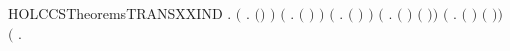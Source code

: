 \begin{SaveVerbatim}{HOLCCSTheoremsTRANSXXIND}
\HOLTokenTurnstile{} \HOLSymConst{\HOLTokenForall{}}.
       \ensuremath{(}\HOLSymConst{\HOLTokenForall{}} .  \ensuremath{(}\HOLSymConst{\ensuremath{\ldotp}}\ensuremath{)}  \ensuremath{)} \HOLSymConst{\HOLTokenConj{}}
       \ensuremath{(}\HOLSymConst{\HOLTokenForall{}}   .     \HOLSymConst{\HOLTokenImp{}}  \ensuremath{(} \HOLSymConst{\ensuremath{+}} \ensuremath{)}  \ensuremath{)} \HOLSymConst{\HOLTokenConj{}}
       \ensuremath{(}\HOLSymConst{\HOLTokenForall{}}   .     \HOLSymConst{\HOLTokenImp{}}  \ensuremath{(} \HOLSymConst{\ensuremath{+}} \ensuremath{)}  \ensuremath{)} \HOLSymConst{\HOLTokenConj{}}
       \ensuremath{(}\HOLSymConst{\HOLTokenForall{}}   .     \HOLSymConst{\HOLTokenImp{}}  \ensuremath{(} \HOLSymConst{\ensuremath{\mid}} \ensuremath{)}  \ensuremath{(} \HOLSymConst{\ensuremath{\mid}} \ensuremath{)}\ensuremath{)} \HOLSymConst{\HOLTokenConj{}}
       \ensuremath{(}\HOLSymConst{\HOLTokenForall{}}   .     \HOLSymConst{\HOLTokenImp{}}  \ensuremath{(} \HOLSymConst{\ensuremath{\mid}} \ensuremath{)}  \ensuremath{(} \HOLSymConst{\ensuremath{\mid}} \ensuremath{)}\ensuremath{)} \HOLSymConst{\HOLTokenConj{}}
       \ensuremath{(}\HOLSymConst{\HOLTokenForall{}}    .

\end{SaveVerbatim}

